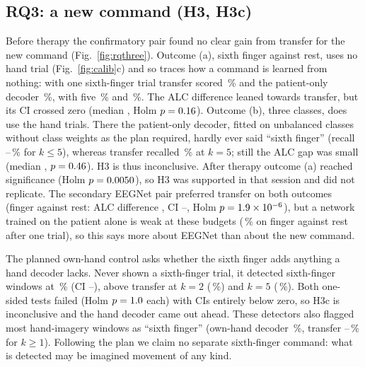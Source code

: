 \subsection{RQ3: a new command (H3, H3c)}
\label{sec:newcommand}
Before therapy the confirmatory pair found no clear gain from transfer for the new command
(Fig.~\ref{fig:rqthree}). Outcome (a), sixth finger against rest, uses no hand trial
(Fig.~\ref{fig:calib}c) and so traces how a command is learned from nothing: with one
sixth-finger trial transfer scored \rqThreeSfRestRctTslrKOneMean\,\% and the patient-only decoder
\rqThreeSfRestTsLrKOneMean\,\%, with five \rqThreeSfRestRctTslrKFiveMean\,\% and
\rqThreeSfRestTsLrKFiveMean\,\%. The ALC difference leaned towards transfer, but its CI crossed
zero (median \rqThreeHThreeAMedianDiff, Holm $p = 0.16$). Outcome (b), three
classes, does use the hand trials. There the patient-only decoder, fitted on unbalanced classes
without class weights as the plan required, hardly ever said ``sixth finger'' (recall
\rqThreeRestAhSfTsLrSfRecallMin--\rqThreeRestAhSfTsLrSfRecallMax\,\% for $k \leq 5$), whereas
transfer recalled \rqThreeRestAhSfRctTslrKFiveSfRecall\,\% at $k = 5$; still the ALC gap was small
(median \rqThreeHThreeBMedianDiff, $p = 0.46$). H3 is thus inconclusive. After
therapy outcome (a) reached significance (Holm $p = 0.0050$), so H3 was
supported in that session and did not replicate. The secondary EEGNet pair preferred transfer on
both outcomes (finger against rest: ALC difference \rqThreeEegnetHThreeADiff, CI
\rqThreeEegnetHThreeADiffCiLo--\rqThreeEegnetHThreeADiffCiHi, Holm
$p = 1.9\times10^{-6}$), but a network trained on the patient alone is weak at these
budgets (\rqThreeSfRestEegnetScratchKOneMean\,\% on finger against rest after one trial), so this
says more about EEGNet than about the new command.

The planned own-hand control asks whether the sixth finger adds anything a hand decoder lacks.
Never shown a sixth-finger trial, it detected sixth-finger windows at
\rqThreeSfRestAhProxyMean\,\% (CI \rqThreeSfRestAhProxyCiLo--\rqThreeSfRestAhProxyCiHi), above
transfer at $k = 2$ (\rqThreeSfRestRctTslrKTwoMean\,\%) and $k = 5$
(\rqThreeSfRestRctTslrKFiveMean\,\%). Both one-sided tests failed (Holm
$p = 1.0$ each) with CIs entirely below zero, so H3c is inconclusive and the
hand decoder came out ahead. These detectors also flagged most hand-imagery windows as ``sixth
finger'' (own-hand decoder \rqThreeHandAsFingerAhProxy\,\%, transfer
\rqThreeHandAsFingerRctTslrKAll--\rqThreeHandAsFingerRctTslrKOne\,\% for $k \geq 1$). Following
the plan we claim no separate sixth-finger command: what is detected may be imagined movement of
any kind.

